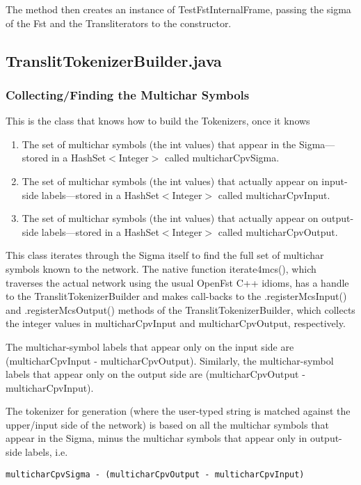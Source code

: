 \documentclass[letterpaper,12pt]{article}
\begin{document}
The method then creates an instance of TestFstInternalFrame, passing the
sigma of the Fst and the 
Transliterators to the constructor.

\subsection{TranslitTokenizerBuilder.java}

\subsubsection{Collecting/Finding the Multichar Symbols}

This is the class that knows how to build the Tokenizers, once it knows

\begin{enumerate}
\item
The set of multichar symbols (the int values) that appear in the Sigma---stored in
a HashSet$<$Integer$>$ called multicharCpvSigma.
\item
The set of multichar symbols (the int values) that actually appear on input-side
labels---stored in a HashSet$<$Integer$>$ called multicharCpvInput.
\item
The set of multichar symbols (the int values) that actually appear on output-side
labels---stored in a HashSet$<$Integer$>$ called multicharCpvOutput.
\end{enumerate}

\noindent
This class iterates through the Sigma itself to find the full set of
multichar symbols known to the network.  The native function iterate4mcs(),
which traverses the actual network using the usual OpenFst C++ idioms, has
a handle to the TranslitTokenizerBuilder and makes call-backs to the
.registerMcsInput() and .registerMcsOutput() methods of the
TranslitTokenizerBuilder, which collects the integer values in
multicharCpvInput and multicharCpvOutput, respectively.

The multichar-symbol labels that appear only on the input side are
(multicharCpvInput - multicharCpvOutput).  Similarly, the multichar-symbol
labels that appear only on the output side are (multicharCpvOutput -
multicharCpvInput).

The tokenizer for generation (where the user-typed string is matched
against the upper/input side of the network) is based on all the multichar
symbols that appear in the Sigma, minus the multichar symbols that appear
only in output-side labels, i.e.

\begin{Verbatim}[fontsize=\small]
multicharCpvSigma - (multicharCpvOutput - multicharCpvInput)
\end{Verbatim}
\end{document}
